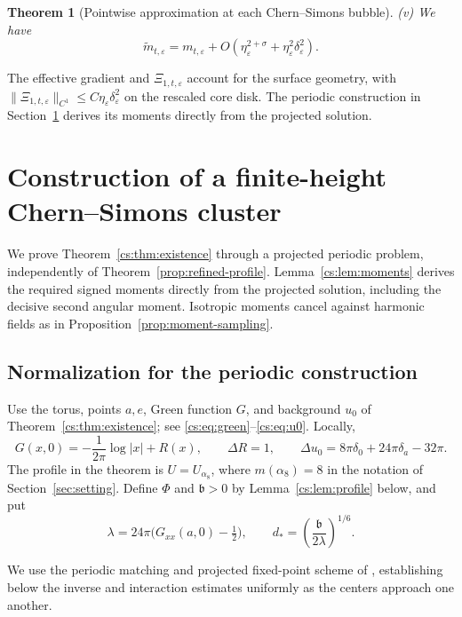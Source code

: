 \documentclass[11pt,reqno]{amsart}
\numberwithin{equation}{section}
\newtheorem{theorem}{Theorem}[section]
\theoremstyle{definition}
\theoremstyle{remark}
\newcommand{\eps}{\varepsilon}
\newcommand{\etae}{\eta_{\eps}}
\newcommand{\de}{\delta_{\eps}}
\begin{document}
\begin{theorem}[Pointwise approximation at each Chern--Simons bubble]
\smallskip
\noindent\textup{(v)} We have
\begin{equation}
  \widetilde m_{t,\eps}=m_{t,\eps}
  +O(\etae^{2+\sigma}+\etae^2\de^2).
  \label{eq:local-mass-refined}
\end{equation}
\end{theorem}

The effective gradient and $\Xi_{1,t,\eps}$ account for the surface
geometry, with $\|\Xi_{1,t,\eps}\|_{C^1}\le C\etae\de^2$ on the
rescaled core disk. The periodic construction in
Section~\ref{sec:cs-construction} derives its moments directly from
the projected solution.

\section{Construction of a finite-height Chern--Simons cluster}
\label{sec:cs-construction}

We prove Theorem~\ref{cs:thm:existence} through a projected periodic
problem, independently of Theorem~\ref{prop:refined-profile}.
Lemma~\ref{cs:lem:moments} derives the required signed moments directly
from the projected solution, including the decisive second angular moment.
Isotropic moments cancel against harmonic fields as in
Proposition~\ref{prop:moment-sampling}.

\subsection{Normalization for the periodic construction}

Use the torus, points $a,e$, Green function $G$, and background
$u_0$ of Theorem~\ref{cs:thm:existence}; see
\eqref{cs:eq:green}--\eqref{cs:eq:u0}. Locally,
\[
 G(x,0)=-\frac1{2\pi}\log|x|+R(x),\qquad \Delta R=1,
 \qquad \Delta u_0=8\pi\delta_0+24\pi\delta_a-32\pi.
\]
The profile in the theorem is $U=U_{\alpha_8}$, where
$m(\alpha_8)=8$ in the notation of Section~\ref{sec:setting}.
Define $\Phi$ and $\mathfrak b>0$ by Lemma~\ref{cs:lem:profile} below, and put
\begin{equation}\label{cs:eq:lambda}
 \lambda=24\pi\bigl(G_{xx}(a,0)-\tfrac12\bigr),\qquad
 d_*=\left(\frac{\mathfrak b}{2\lambda}\right)^{1/6}.
\end{equation}

We use the periodic matching and projected fixed-point scheme of
\cite[Section~3, especially Proposition~3.3]{LinYanAIHP},
establishing below the inverse and interaction estimates uniformly
as the centers approach one another.
\end{document}
